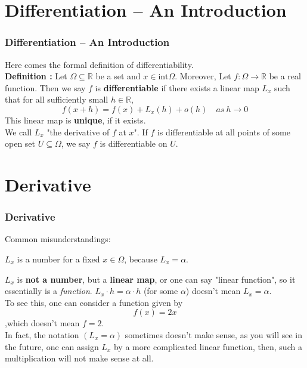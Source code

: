 \documentclass[12pt, t]{beamer}
\renewcommand{\emph}[1]{{\color{Turquoise3}\textsl{#1}}}
\begin{document}
\section{Differentiation -- An Introduction}
\begin{frame}
    \frametitle{Differentiation -- An Introduction}
Here comes the formal definition of differentiability.\\
\vspace{2em}
\textbf{Definition : } 
    Let $\Omega\subseteq\mathbb{R}$ be a set and $x\in \text{int}\Omega$. Moreover, Let $f:\Omega\rightarrow \mathbb{R}$ be a real function. 
    Then we say $f$ is \textbf{differentiable} if there exists a linear map $L_x$ such that for all sufficiently small $h\in\mathbb{R}$, 
\begin{equation*}
    f(x+h)=f(x)+L_x(h)+o(h)\quad as\ h\rightarrow 0
\end{equation*}
This linear map is \textbf{unique}, if it exists. \\
\vspace{1em}
We call $L_x$ "the derivative of $f$ at $x$". If $f$ is differentiable at all points of some open 
set $U\subseteq \Omega$, we say $f$ is differentiable on $U$. 

\end{frame}

\section{Derivative}
\begin{frame}
    \frametitle{Derivative}
Common misunderstandings:\\
\vspace{0.5em}
    \begin{center}
        $L_x$ is a number for a fixed $x\in \Omega$, because $L_x=\alpha$.
    \end{center}
\vspace{0.5em}
\hspace{1em}
$L_x$ is \textbf{not a number}, but a \textbf{linear map}, or one can say "linear function", so it essentially is a \emph{function}.
$L_x\cdot h=\alpha\cdot h$ (for some $\alpha$) doesn't mean $L_x=\alpha$.\\
\hspace{1em} To see this, one can consider a function given by 
\begin{equation*}
    f(x)=2x
\end{equation*}
,which doesn't mean $f=2$.\\

In fact, the notation $(L_x=\alpha)$ sometimes doesn't make sense, as you will see in the future,
one can assign $L_x$ by a more complicated linear function, then, such a multiplication will not make sense at all.

\end{frame}
\end{document}
